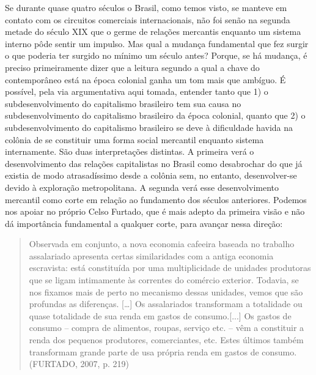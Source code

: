 Se durante quase quatro séculos o Brasil, como temos visto, se manteve
em contato com os circuitos comerciais internacionais, não foi senão na
segunda metade do século XIX que o germe de relações mercantis enquanto
um sistema interno pôde sentir um impulso. Mas qual a mudança
fundamental que fez surgir o que poderia ter surgido no mínimo um século
antes? Porque, se há mudança, é preciso primeiramente dizer que a
leitura segundo a qual a chave do contemporâneo está na época colonial
ganha um tom mais que ambíguo. É possível, pela via argumentativa aqui
tomada, entender tanto que 1) o subdesenvolvimento do capitalismo
brasileiro tem sua causa no subdesenvolvimento do capitalismo brasileiro
da época colonial, quanto que 2) o subdesenvolvimento do capitalismo
brasileiro se deve à dificuldade havida na colônia de se constituir uma
forma social mercantil enquanto sistema internamente. São duas
interpretações distintas. A primeira verá o desenvolvimento das relações
capitalistas no Brasil como desabrochar do que já existia de modo
atrasadíssimo desde a colônia sem, no entanto, desenvolver-se devido à
exploração metropolitana. A segunda verá esse desenvolvimento mercantil
como corte em relação ao fundamento dos séculos anteriores. Podemos nos
apoiar no próprio Celso Furtado, que é mais adepto da primeira visão e
não dá importância fundamental a qualquer corte, para avançar nessa
direção:

\begin{quote}
Observada em conjunto, a nova economia cafeeira baseada no trabalho
assalariado apresenta certas similaridades com a antiga economia
escravista: está constituída por uma multiplicidade de unidades
produtoras que se ligam intimamente às correntes do comércio exterior.
Todavia, se nos fixamos mais de perto no mecanismo dessas unidades,
vemos que são profundas as diferenças. {[}\ldots{}{]} Os assalariados
transformam a totalidade ou quase totalidade de sua renda em gastos de
consumo.{[}...{]} Os gastos de consumo -- compra de alimentos, roupas,
serviço etc. -- vêm a constituir a renda dos pequenos produtores,
comerciantes, etc. Estes últimos também transformam grande parte de usa
própria renda em gastos de consumo. (FURTADO, 2007, p. 219)
\end{quote}

